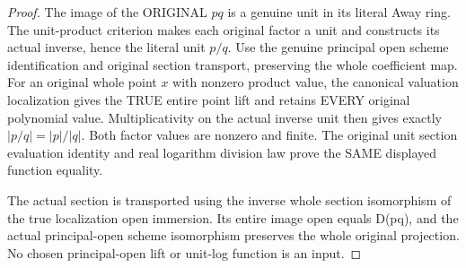 \begin{proof}
The image of the ORIGINAL $pq$ is a genuine unit in its literal Away ring.
The unit-product criterion makes each original factor a unit and constructs
its actual inverse, hence the literal unit $p/q$. Use the genuine principal
open scheme identification and original section transport, preserving the
whole coefficient map. For an original whole point $x$ with nonzero product
value, the canonical valuation localization gives the TRUE entire point
lift and retains EVERY original polynomial value. Multiplicativity on the
actual inverse unit then gives exactly $|p/q|=|p|/|q|$. Both factor values
are nonzero and finite. The original unit section evaluation identity and
real logarithm division law prove the SAME displayed function equality.

The actual section is transported using the inverse whole section isomorphism
of the true localization open immersion. Its entire image open equals D(pq),
and the actual principal-open scheme isomorphism preserves the whole original
projection. No chosen principal-open lift or unit-log function is an input.
\end{proof}

